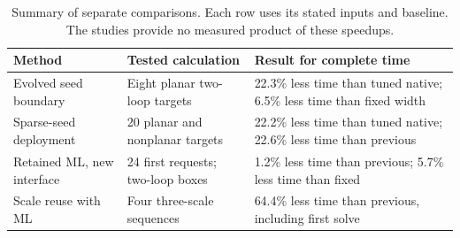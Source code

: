 \begin{table}[!htbp]
\centering\small
\caption{Summary of separate comparisons. Each row uses its stated inputs and baseline. The studies provide no measured product of these speedups.}
\label{history:tab:overall}
\begin{tabularx}{\linewidth}{@{}lYY@{}}\toprule
Method & Tested calculation & Result for complete time\\\midrule
Evolved seed boundary & Eight planar two-loop targets & 22.3\% less time than tuned native; 6.5\% less time than fixed width\\
Sparse-seed deployment & 20 planar and nonplanar targets & 22.2\% less time than tuned native; 22.6\% less time than previous\\
Retained ML, new interface & 24 first requests; two-loop boxes & 1.2\% less time than previous; 5.7\% less time than fixed\\
Scale reuse with ML & Four three-scale sequences & 64.4\% less time than previous, including first solve\\


\end{tabularx}
\end{table}
